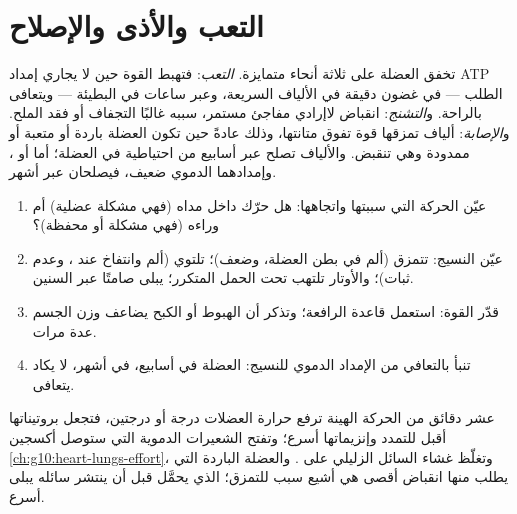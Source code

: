 \section{التعب والأذى والإصلاح}

\begin{proposition}\label{prop:g10:muscles-and-joints:limits}
تخفق العضلة على ثلاثة أنحاء متمايزة. \emph{التعب}: فتهبط القوة حين لا
يجاري إمداد ATP الطلب --- في غضون دقيقة في الألياف السريعة، وعبر ساعات
في البطيئة --- ويتعافى بالراحة. و\emph{التشنج}: انقباض لاإرادي مفاجئ
مستمر، سببه غالبًا التجفاف أو فقد الملح. و\emph{الإصابة}: ألياف تمزقها
قوة تفوق متانتها، وذلك عادةً حين تكون العضلة باردة أو متعبة أو ممدودة
وهي تنقبض. والألياف تصلح عبر أسابيع من  احتياطية في العضلة؛ أما
 أو ، وإمدادهما الدموي ضعيف، فيصلحان عبر أشهر.
\end{proposition}
\admitted

\begin{method}\label{met:g10:muscles-and-joints:analyse}
\begin{enumerate}
  \item عيّن الحركة التي سببتها واتجاهها: هل حرّك  داخل مداه
        (فهي مشكلة عضلية) أم وراءه (فهي مشكلة  أو محفظة)؟
  \item عيّن النسيج:  تتمزق (ألم في بطن العضلة،
        وضعف)؛  تلتوي (ألم وانتفاخ عند ، وعدم ثبات)؛
        والأوتار تلتهب تحت الحمل المتكرر؛  يبلى صامتًا عبر
        السنين.
  \item قدّر القوة: استعمل قاعدة الرافعة؛ وتذكر أن الهبوط أو الكبح
        يضاعف وزن الجسم عدة مرات.
  \item تنبأ بالتعافي من الإمداد الدموي للنسيج: العضلة في أسابيع،
          في أشهر،  لا يكاد يتعافى.
\end{enumerate}
\end{method}

\begin{remark}\label{rem:g10:muscles-and-joints:warmup}
عشر دقائق من الحركة الهينة ترفع حرارة العضلات درجة أو درجتين، فتجعل
بروتيناتها أقبل للتمدد وإنزيماتها أسرع؛ وتفتح الشعيرات الدموية التي
ستوصل أكسجين \cref{ch:g10:heart-lungs-effort}، وتغلّظ غشاء السائل
الزليلي على . والعضلة الباردة التي يطلب منها انقباض أقصى هي
أشيع سبب للتمزق؛  الذي يحمَّل قبل أن ينتشر سائله يبلى أسرع.
\end{remark}

